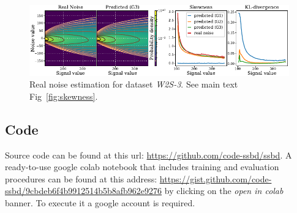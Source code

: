 \documentclass{article}
\begin{document}
\begin{figure}[ht]
\begin{center}
\centerline{\includegraphics[width=\columnwidth]{fig_skewness_1col_w2s-3.pdf}}
\caption{Real noise estimation for dataset \textit{W2S-3}. See main text Fig~\ref{fig:skewness}.
}
\end{center}
\end{figure}
\FloatBarrier
\subsection{Code}
\label{sec:code}
Source code can be found at this url: \url{https://github.com/code-ssbd/ssbd}.
A ready-to-use google colab notebook that includes training and evaluation procedures can be found at this address: \url{https://gist.github.com/code-ssbd/9cbdeb6f4b9912514b5b8afb962e9276} by clicking on the \textit{open in colab} banner. To execute it a google account is required.


% 
% 
%
\end{document}
